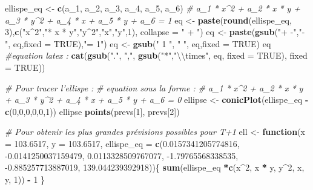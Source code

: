 \documentclass[french]{article}
\newenvironment{Shaded}{\begin{snugshade}}{\end{snugshade}}
\newcommand{\CharTok}[1]{\textcolor[rgb]{0.31,0.60,0.02}{#1}}
\newcommand{\CommentTok}[1]{\textcolor[rgb]{0.56,0.35,0.01}{\textit{#1}}}
\newcommand{\ControlFlowTok}[1]{\textcolor[rgb]{0.13,0.29,0.53}{\textbf{#1}}}
\newcommand{\DataTypeTok}[1]{\textcolor[rgb]{0.13,0.29,0.53}{#1}}
\newcommand{\DecValTok}[1]{\textcolor[rgb]{0.00,0.00,0.81}{#1}}
\newcommand{\FloatTok}[1]{\textcolor[rgb]{0.00,0.00,0.81}{#1}}
\newcommand{\KeywordTok}[1]{\textcolor[rgb]{0.13,0.29,0.53}{\textbf{#1}}}
\newcommand{\NormalTok}[1]{#1}
\newcommand{\OperatorTok}[1]{\textcolor[rgb]{0.81,0.36,0.00}{\textbf{#1}}}
\newcommand{\OtherTok}[1]{\textcolor[rgb]{0.56,0.35,0.01}{#1}}
\newcommand{\StringTok}[1]{\textcolor[rgb]{0.31,0.60,0.02}{#1}}
\begin{document}
\begin{Shaded}
\begin{Highlighting}[]
\NormalTok{ellispe_eq <-}\StringTok{ }\KeywordTok{c}\NormalTok{(a_}\DecValTok{1}\NormalTok{, a_}\DecValTok{2}\NormalTok{, a_}\DecValTok{3}\NormalTok{, a_}\DecValTok{4}\NormalTok{,}
\NormalTok{                a_}\DecValTok{5}\NormalTok{, a_}\DecValTok{6}\NormalTok{)}
\CommentTok{# a_1 * x^2 + a_2 * x * y + a_3 * y^2 + a_4 * x + a_5 * y + a_6 = 1}
\NormalTok{eq <-}\StringTok{ }\KeywordTok{paste}\NormalTok{(}\KeywordTok{round}\NormalTok{(ellispe_eq, }\DecValTok{3}\NormalTok{),}\KeywordTok{c}\NormalTok{(}\StringTok{"x^2"}\NormalTok{,}\StringTok{"* x * y"}\NormalTok{,}\StringTok{"y^2"}\NormalTok{,}\StringTok{"x"}\NormalTok{,}\StringTok{"y"}\NormalTok{,}\DecValTok{1}\NormalTok{),}
            \DataTypeTok{collapse =} \StringTok{" + "}\NormalTok{)}
\NormalTok{eq <-}\StringTok{ }\KeywordTok{paste}\NormalTok{(}\KeywordTok{gsub}\NormalTok{(}\StringTok{"+ -"}\NormalTok{,}\StringTok{"- "}\NormalTok{, eq,}\DataTypeTok{fixed =} \OtherTok{TRUE}\NormalTok{),}\StringTok{"= 1"}\NormalTok{)}
\NormalTok{eq <-}\StringTok{ }\KeywordTok{gsub}\NormalTok{(}\StringTok{" 1 "}\NormalTok{, }\StringTok{" "}\NormalTok{, eq,}\DataTypeTok{fixed =} \OtherTok{TRUE}\NormalTok{)}
\NormalTok{eq}
\CommentTok{#equation latex :}
\KeywordTok{cat}\NormalTok{(}\KeywordTok{gsub}\NormalTok{(}\StringTok{"."}\NormalTok{, }\StringTok{","}\NormalTok{,}
         \KeywordTok{gsub}\NormalTok{(}\StringTok{"*"}\NormalTok{,}\StringTok{"}\CharTok{\textbackslash{}\textbackslash{}}\StringTok{times"}\NormalTok{, eq, }\DataTypeTok{fixed =} \OtherTok{TRUE}\NormalTok{),}
         \DataTypeTok{fixed =} \OtherTok{TRUE}\NormalTok{))}

\CommentTok{# Pour tracer l'ellispe :}
\CommentTok{# equation sous la forme :}
\CommentTok{# a_1 * x^2 + a_2 * x * y + a_3 * y^2 + a_4 * x + a_5 * y + a_6 = 0}
\NormalTok{ellipse <-}\StringTok{ }\KeywordTok{conicPlot}\NormalTok{(ellispe_eq }\OperatorTok{-}\StringTok{ }\KeywordTok{c}\NormalTok{(}\DecValTok{0}\NormalTok{,}\DecValTok{0}\NormalTok{,}\DecValTok{0}\NormalTok{,}\DecValTok{0}\NormalTok{,}\DecValTok{0}\NormalTok{,}\DecValTok{1}\NormalTok{))}
\NormalTok{ellipse}
\KeywordTok{points}\NormalTok{(prevs[}\DecValTok{1}\NormalTok{], prevs[}\DecValTok{2}\NormalTok{])}

\CommentTok{# Pour obtenir les plus grandes prévisions possibles pour T+1}
\NormalTok{ell <-}\StringTok{ }\ControlFlowTok{function}\NormalTok{(}\DataTypeTok{x =} \FloatTok{103.6517}\NormalTok{, }\DataTypeTok{y =} \FloatTok{103.6517}\NormalTok{, }
                \DataTypeTok{ellispe_eq =} \KeywordTok{c}\NormalTok{(}\FloatTok{0.0157341205774816}\NormalTok{, }\FloatTok{-0.0141250037159479}\NormalTok{, }\FloatTok{0.0113328509767077}\NormalTok{, }
                               \FloatTok{-1.79765568338535}\NormalTok{, }\FloatTok{-0.885257713887019}\NormalTok{, }\FloatTok{139.044239392918}\NormalTok{))\{}
    \KeywordTok{sum}\NormalTok{(ellispe_eq }\OperatorTok{*}\KeywordTok{c}\NormalTok{(x}\OperatorTok{^}\DecValTok{2}\NormalTok{, x }\OperatorTok{*}\StringTok{ }\NormalTok{y, y}\OperatorTok{^}\DecValTok{2}\NormalTok{, x, y, }\DecValTok{1}\NormalTok{)) }\OperatorTok{-}\StringTok{ }\DecValTok{1}
\NormalTok{\}}


\end{Highlighting}
\end{Shaded}
\end{document}
